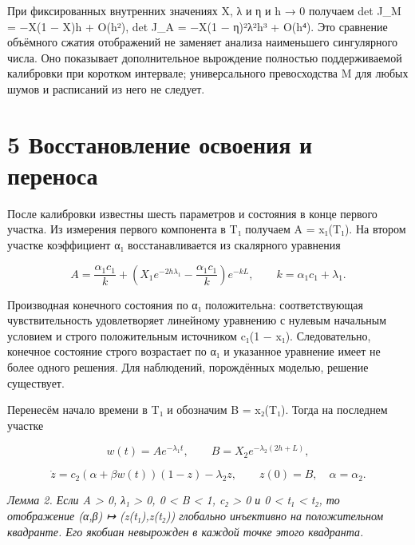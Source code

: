 \documentclass[11pt,a4paper]{article}
\begin{document}
При фиксированных внутренних значениях X, λ и η и h → 0 получаем det J\_M = −X(1 − X)h + O(h²), det J\_A = −X(1 − η)²λ²h³ + O(h⁴). Это сравнение объёмного сжатия отображений не заменяет анализа наименьшего сингулярного числа. Оно показывает дополнительное вырождение полностью поддерживаемой калибровки при коротком интервале; универсального превосходства M для любых шумов и расписаний из него не следует.\par

\section*{5 Восстановление освоения и переноса}

После калибровки известны шесть параметров и состояния в конце первого участка. Из измерения первого компонента в T₁ получаем A = x₁(T₁). На втором участке коэффициент α₁ восстанавливается из скалярного уравнения\par

\begin{equation}A=\frac{\alpha_1c_1}{k}+\left(X_1e^{-2h\lambda_1}-\frac{\alpha_1c_1}{k}\right)e^{-kL},\qquad k=\alpha_1c_1+\lambda_1.\end{equation}

Производная конечного состояния по α₁ положительна: соответствующая чувствительность удовлетворяет линейному уравнению с нулевым начальным условием и строго положительным источником c₁(1 − x₁). Следовательно, конечное состояние строго возрастает по α₁ и указанное уравнение имеет не более одного решения. Для наблюдений, порождённых моделью, решение существует.\par

Перенесём начало времени в T₁ и обозначим B = x₂(T₁). Тогда на последнем участке\par

\begin{equation}w(t)=Ae^{-\lambda_1t},\qquad B=X_2e^{-\lambda_2(2h+L)},\end{equation}

\begin{equation}\dot z=c_2(\alpha+\beta w(t))(1-z)-\lambda_2z,\qquad z(0)=B,\quad \alpha=\alpha_2.\end{equation}

\textit{Лемма 2. Если A > 0, λ₁ > 0, 0 < B < 1, c₂ > 0 и 0 < t₁ < t₂, то отображение (α,β) ↦ (z(t₁),z(t₂)) глобально инъективно на положительном квадранте. Его якобиан невырожден в каждой точке этого квадранта.}\par
\end{document}
